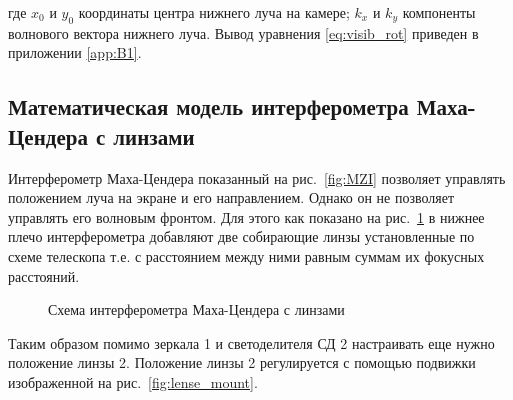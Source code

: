 где $x_0$ и $y_0$ координаты центра нижнего луча на камере; $k_x$ и $k_y$ компоненты волнового вектора нижнего луча. Вывод уравнения \ref{eq:visib_rot} приведен в приложении \ref{app:B1}.

\subsection{Математическая модель интерферометра Маха-Цендера с линзами}\label{sec:ch2/sec1/subsec4}

Интерферометр Маха-Цендера показанный на рис.~\ref{fig:MZI} позволяет управлять положением луча на экране и его направлением. Однако он не позволяет управлять его волновым фронтом. Для этого как показано на рис.~\ref{fig:MZI_expl_lenses} в нижнее плечо интерферометра добавляют две собирающие линзы установленные по схеме телескопа т.е. с расстоянием между ними равным суммам их фокусных расстояний. 

\begin{figure}[ht]
\caption{Схема интерферометра Маха-Цендера с линзами}
\label{fig:MZI_expl_lenses}
\end{figure}

Таким образом помимо зеркала 1 и светоделителя СД 2 настраивать еще нужно положение линзы 2. Положение линзы 2 регулируется с помощью подвижки изображенной на рис.~\ref{fig:lense_mount}. 


